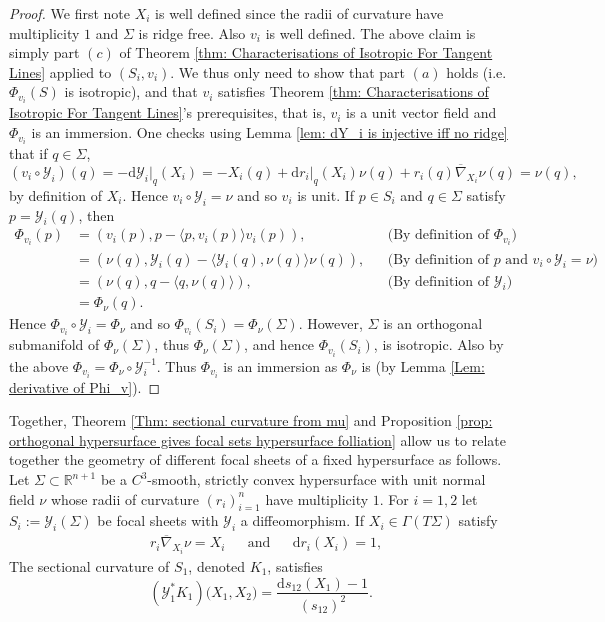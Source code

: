 \documentclass[12pt]{amsart}
\theoremstyle{plain}
\newenvironment{Mainthm}[1]{%
  \IfBlankTF{#1}
    {\renewcommand{\theMainthminner}{\unskip}}
    {\renewcommand\theMainthminner{#1}}%
  \Mainthminner
}{\endMainthminner}
\theoremstyle{definition}
\def\R{\mathbb{R}}
\newcommand{\td}{\mathrm{d}}
\numberwithin{equation}{section}
\begin{document}
\begin{proof}
    We first note $X_i$ is well defined since the radii of curvature have multiplicity $1$ and $\Sigma$ is ridge free. Also $v_i$ is well defined.
    The above claim is simply part $(c)$ of Theorem \ref{thm: Characterisations of Isotropic For Tangent Lines} applied to $(S_i,v_i)$. We thus only need to show that part $(a)$ holds (i.e. $\Phi_{v_i}(S)$ is isotropic), and that $v_i$ satisfies Theorem \ref{thm: Characterisations of Isotropic For Tangent Lines}'s prerequisites, that is, $v_i$ is a unit vector field and $\Phi_{v_i}$ is an immersion. One checks using Lemma \ref{lem: dY_i is injective iff no ridge} that if $q\in\Sigma$,
    \[
    (v_i\circ\mathcal{Y}_i)(q)=-\td\mathcal{Y}_i{\big|_q}(X_i)=-X_i(q)+\td r_i|_q(X_i)\nu(q)+r_i(q)\overline{\nabla}_{X_i}\nu(q)=\nu(q),
    \]
    by definition of $X_i$. Hence $v_i\circ\mathcal{Y}_i=\nu$ and so $v_i$ is unit. If $p\in S_i$ and $q\in \Sigma$ satisfy $p=\mathcal{Y}_i(q)$, then
    \begin{align*}
    \Phi_{v_i}(p)&=(v_i(p),p-\langle p,v_i(p)\rangle v_i(p)), &&\text{(By definition of $\Phi_{v_i}$)}\\
    &=(\nu(q), \mathcal{Y}_i(q)-\langle\mathcal{Y}_i(q),\nu(q)\rangle \nu(q)), &&\text{(By definition of $p$ and $v_i\circ \mathcal{Y}_i=\nu$)}\\
    &=(\nu(q),q-\langle q, \nu(q) \rangle), &&\text{(By definition of $\mathcal{Y}_i$)}\\
    &=\Phi_\nu(q).
    \end{align*}
    Hence $\Phi_{v_i}\circ \mathcal{Y}_i=\Phi_\nu$ and so $\Phi_{v_i}(S_i)=\Phi_\nu(\Sigma)$. However, $\Sigma$ is an orthogonal submanifold of $\Phi_\nu(\Sigma)$, thus $\Phi_\nu(\Sigma)$, and hence $\Phi_{v_i}(S_i)$, is isotropic. Also by the above $\Phi_{v_i}=\Phi_\nu\circ\mathcal{Y}_i^{-1}$. Thus $\Phi_{v_i}$ is an immersion as $\Phi_\nu$ is (by Lemma \ref{Lem: derivative of Phi_v}).
\end{proof}
Together, Theorem \ref{Thm: sectional curvature from mu} and Proposition \ref{prop: orthogonal hypersurface gives focal sets hypersurface folliation} allow us to relate together the geometry of different focal sheets of a fixed hypersurface as follows.
\begin{Mainthm}{2}\label{thm: sectional curvature of hypersurface focal set}
Let $\Sigma\subset \R^{n+1}$ be a $C^3$-smooth, strictly convex hypersurface with unit normal field $\nu$ whose radii of curvature $(r_i)_{i=1}^n$ have multiplicity $1$. For $i=1,2$ let $S_i:=\mathcal{Y}_i(\Sigma)$ be focal sheets with $\mathcal{Y}_i$ a diffeomorphism. If $X_i\in\Gamma(T\Sigma)$ satisfy
    \begin{align*}
       &r_i\overline{\nabla}_{X_i}\nu =X_i &&\text{and} &&\td r_i(X_i)=1,
    \end{align*}
      The sectional curvature of $S_1$, denoted $K_1$, satisfies
    \begin{equation}\label{equ: sectional curvature of focal set}
    (\mathcal{Y}_1^\ast K_1)\big(X_1,X_2)=\frac{\td s_{12}(X_1)-1}{(s_{12})^2}.
    \end{equation}
\end{Mainthm}
\end{document}
